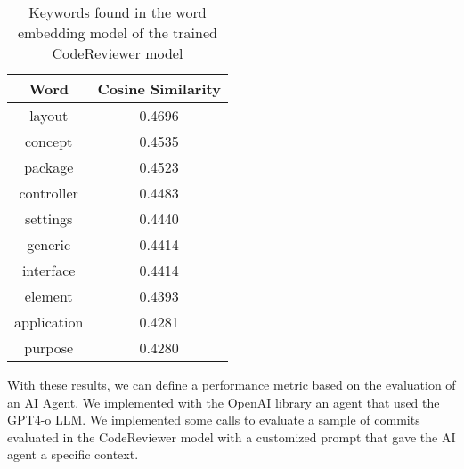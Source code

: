 \begin{table}[h]
    \centering
    \begin{tabular}{|c|c|}
    \hline
       Word  & Cosine Similarity \\
    \hline
        layout & 0.4696 \\
        \hline
        concept & 0.4535 \\
        \hline
        package & 0.4523 \\
        \hline
        controller & 0.4483 \\
        \hline
        settings & 0.4440 \\
        \hline
        generic & 0.4414 \\
        \hline
        interface & 0.4414 \\
        \hline
        element & 0.4393 \\
        \hline
        application & 0.4281 \\
        \hline
        purpose & 0.4280 \\
    \hline
    \end{tabular}
    \caption{Keywords found in the word embedding model of the trained CodeReviewer model}
    \label{tab:my_label}
\end{table}

With these results, we can define a performance metric based on the evaluation of an AI Agent. We implemented with the OpenAI library an agent that used the GPT4-o LLM. We implemented some calls to evaluate a sample of commits evaluated in the CodeReviewer model with a customized prompt that gave the AI agent a specific context.

